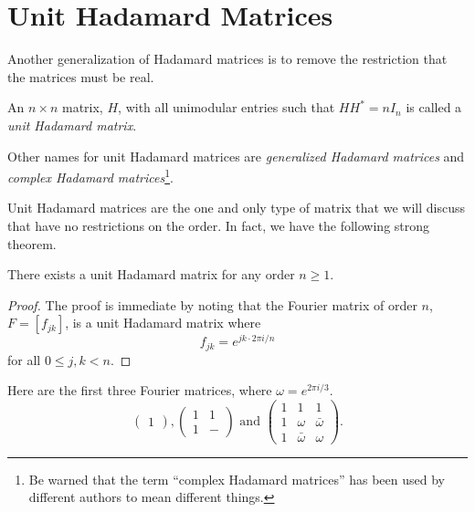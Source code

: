 \section[Unit Hadamard Matrices]{Unit Hadamard Matrices}
\label{sec:unit-hada}

Another generalization of Hadamard matrices is to remove the restriction that the matrices must be real.

\begin{definition} \label{def:unit-hada}
 An $n \times n$ matrix, $H$, with all unimodular entries such that $HH^* = nI_n$ is called a {\it unit Hadamard matrix}.
\end{definition}

Other names for unit Hadamard matrices are {\it generalized Hadamard matrices} and {\it complex Hadamard matrices}\footnote{Be warned that the term ``complex Hadamard matrices'' has been used by different authors to mean different things.}.

Unit Hadamard matrices are the one and only type of matrix that we will discuss that have no restrictions on the order. In fact, we have the following strong theorem.

\begin{theorem} \label{th:fourier}
 There exists a unit Hadamard matrix for any order $n \geq 1$.
 \begin{proof}
  The proof is immediate by noting that the Fourier matrix of order $n$, $F = [f_{jk}]$, is a unit Hadamard matrix where $$f_{jk} = e^{jk\cdot2\pi i/n}$$ for all $0 \leq j, k < n$.
 \end{proof}

\end{theorem}

\begin{example} \label{ex:fourier}
 Here are the first three Fourier matrices, where $\omega = e^{2\pi i/3}$.
 $$\left(\begin{array}{c}1\end{array}\right) , \left(\begin{array}{cc}1&1\\1&-\end{array}\right) \text{ and } \left(\begin{array}{ccc}1&1&1\\1&\omega&\bar\omega\\1&\bar\omega&\omega\end{array}\right).$$
\end{example}

